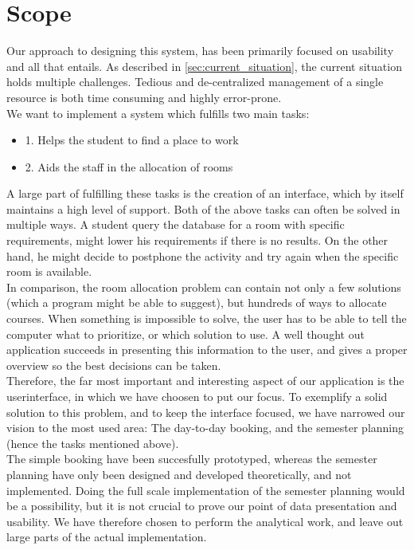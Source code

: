 \section{Scope}
Our approach to designing this system, has been primarily focused on usability and all that entails. As described in \ref{sec:current_situation}, the current situation holds multiple challenges. Tedious and de-centralized management of a single resource is both time consuming and highly error-prone.\\
We want to implement a system which fulfills two main tasks:
\begin{itemize}
	\item 1. Helps the student to find a place to work
	\item 2. Aids the staff in the allocation of rooms
\end{itemize}
A large part of fulfilling these tasks is the creation of an interface, which by itself maintains a high level of support. 
Both of the above tasks can often be solved in multiple ways. A student query the database for a room with specific requirements, might lower his requirements if there is no results. On the other hand, he might decide to postphone  the activity and try again when the specific room is available.\\
In comparison, the room allocation problem can contain not only a few solutions (which a program might be able to suggest), but hundreds of ways to allocate courses. When something is impossible to solve, the user has to be able to tell the computer what to prioritize, or which solution to use.
A well thought out application succeeds in presenting this information to the user, and gives a proper overview so the best decisions can be taken. \\
Therefore, the far most important and interesting aspect of our application is the userinterface, in which we have choosen to put our focus. To exemplify a solid solution to this problem, and to keep the interface focused, we have narrowed our vision to the most used area: The day-to-day booking, and the semester planning (hence the tasks mentioned above). \\

The simple booking have been succesfully prototyped, whereas the semester planning have only been designed and developed theoretically, and not implemented. Doing the full scale implementation of the semester planning would be a possibility, but it is not crucial to prove our point of data presentation and usability. We have therefore chosen to perform the analytical work, and leave out large parts of the actual implementation.

